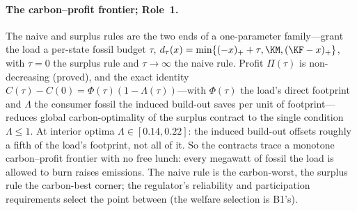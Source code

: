 \paragraph{The carbon--profit frontier; Role~1.} The naive and surplus rules are the two
ends of a one-parameter family---grant the load a per-state fossil budget $\tau$,
$d_{\tau}(x)=\min\{(-x)_++\tau,\KM,(\KF-x)_+\}$, with $\tau=0$ the surplus rule and
$\tau\to\infty$ the naive rule. Profit $\Pi(\tau)$ is non-decreasing (proved), and the
exact identity $C(\tau)-C(0)=\Phi(\tau)(1-\Lambda(\tau))$---with $\Phi(\tau)$ the load's
direct footprint and $\Lambda$ the consumer fossil the induced build-out saves per unit
of footprint---reduces global carbon-optimality of the surplus contract to the single
condition $\Lambda\le1$. At interior optima $\Lambda\in[0.14,0.22]$: the induced build-out offsets
roughly a fifth of the load's footprint, not all of it. So the
contracts trace a monotone carbon--profit frontier with no free lunch: every megawatt of
fossil the load is allowed to burn raises emissions. The naive rule is the carbon-worst,
the surplus rule the carbon-best corner; the regulator's reliability and participation
requirements select the point between (the welfare selection is B1's).
